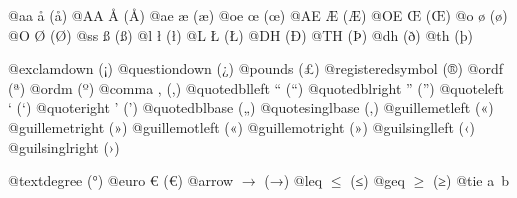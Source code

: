 \documentclass{book}
\renewcommand{\_}{\Texinfounderscore\discretionary{}{}{}}
\begin{document}
@aa \aa{} (å)
@AA \AA{} (Å)
@ae \ae{} (æ)
@oe \oe{} (œ)
@AE \AE{} (Æ)
@OE \OE{} (Œ)
@o \o{} (ø)
@O \O{} (Ø)
@ss \ss{} (ß)
@l \l{} (ł)
@L \L{} (Ł)
@DH \DH{} (Ð)
@TH \TH{} (Þ)
@dh \dh{} (ð)
@th \th{} (þ)

@exclamdown \textexclamdown{} (¡)
@questiondown \textquestiondown{} (¿)
@pounds \textsterling{} (£)
@registeredsymbol \circledR{} (®)
@ordf \textordfeminine{} (ª)
@ordm \textordmasculine{} (º)
@comma , (,)
@quotedblleft \textquotedblleft{} (“)
@quotedblright \textquotedblright{} (”)
@quoteleft \textquoteleft{} (‘)
@quoteright \textquoteright{} (’)
@quotedblbase \quotedblbase{} („)
@quotesinglbase \quotesinglbase{} (‚)
@guillemetleft \guillemotleft{} («)
@guillemetright \guillemotright{} (»)
@guillemotleft \guillemotleft{} («)
@guillemotright \guillemotright{} (»)
@guilsinglleft \guilsinglleft{} (‹)
@guilsinglright \guilsinglright{} (›)

@textdegree \textdegree{} (°)
@euro \euro{} (€)
@arrow $\rightarrow{}$ (→)
@leq $\leq{}$ (≤)
@geq $\geq{}$ (≥)
@tie a~b
\end{document}
